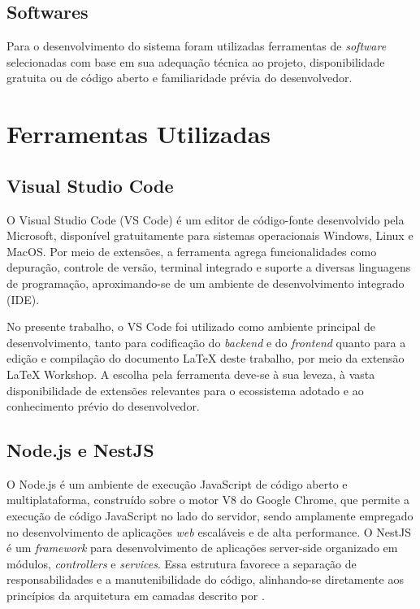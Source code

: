 \subsection{Softwares}
Para o desenvolvimento do sistema foram utilizadas ferramentas de \textit{software} selecionadas com base em sua adequação técnica ao
projeto, disponibilidade gratuita ou de código aberto e familiaridade prévia do desenvolvedor.

\section{Ferramentas Utilizadas}

\subsection{Visual Studio Code}
O Visual Studio Code (VS Code) é um editor de código-fonte desenvolvido pela Microsoft, disponível gratuitamente para sistemas
operacionais Windows, Linux e MacOS. Por meio de extensões, a ferramenta agrega funcionalidades como depuração, controle de versão,
terminal integrado e suporte a diversas linguagens de programação, aproximando-se de um ambiente de desenvolvimento integrado (IDE).

No presente trabalho, o VS Code foi utilizado como ambiente principal de desenvolvimento, tanto para codificação do \textit{backend}
e do \textit{frontend} quanto para a edição e compilação do documento LaTeX deste trabalho, por meio da extensão LaTeX Workshop.
A escolha pela ferramenta deve-se à sua leveza, à vasta disponibilidade de extensões relevantes para o ecossistema adotado
e ao conhecimento prévio do desenvolvedor.

\subsection{Node.js e NestJS}
O Node.js é um ambiente de execução JavaScript de código aberto e multiplataforma, construído sobre o motor V8 do Google Chrome,
que permite a execução de código JavaScript no lado do servidor, sendo amplamente empregado no desenvolvimento de aplicações \textit{web}
escaláveis e de alta performance. O NestJS é um \textit{framework} para desenvolvimento de aplicações server-side organizado em módulos, \textit{controllers}
e \textit{services}. Essa estrutura favorece a separação de responsabilidades e a manutenibilidade do código, alinhando-se diretamente
aos princípios da arquitetura em camadas descrito por \textcite{Fowler2002}.

